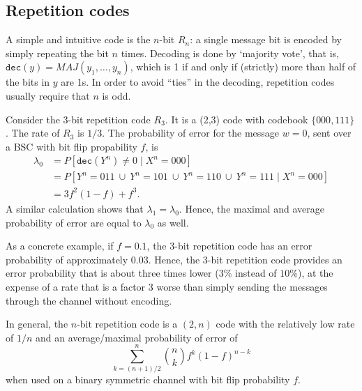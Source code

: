 \subsection{Repetition codes}
A simple and intuitive code is the $n$-bit  $R_n$: a single message bit is encoded by simply repeating the bit $n$ times. Decoding is done by `majority vote', that is, $\mathtt{dec}(y) = MAJ(y_1, \ldots, y_n)$, which is 1 if and only if (strictly) more than half of the bits in $y$ are 1s. In order to avoid ``ties'' in the decoding, repetition codes usually require that $n$ is odd.

\begin{example}
Consider the 3-bit repetition code $R_3$. It is a (2,3) code with codebook $\{000,111\}$. The rate of $R_3$ is $1/3$. The probability of error for the message $w = 0$, sent over a BSC with bit flip propability $f$, is
\begin{align*}
\lambda_0 &= P[\mathtt{dec}(Y^n) \neq 0 \mid X^n = 000]\\
&= P[Y^n = 011 \ \cup \ Y^n = 101 \ \cup \ Y^n = 110 \ \cup \ Y^n = 111 \mid X^n = 000]\\
&= 3f^2(1-f) + f^3.
\end{align*}
A similar calculation shows that $\lambda_1 = \lambda_0$. Hence, the maximal and average probability of error are equal to $\lambda_0$ as well.

As a concrete example, if $f = 0.1$, the 3-bit repetition code has an error probability of approximately 0.03. Hence, the 3-bit repetition code provides an error probability that is about three times lower ($3\%$ instead of $10\%$), at the expense of a rate that is a factor 3 worse than simply sending the messages through the channel without encoding.
\end{example}
In general, the $n$-bit repetition code is a $(2,n)$ code with the relatively low rate of $1/n$ and an average/maximal probability of error of
\[
\sum_{k=(n+1)/2}^n {n \choose k} f^k (1-f)^{n-k}
\]
when used on a binary symmetric channel with bit flip probability $f$.

